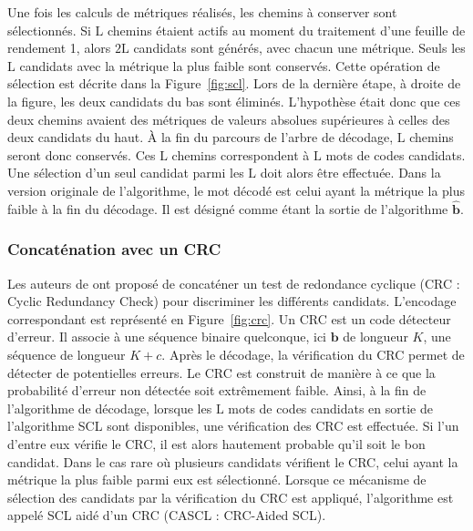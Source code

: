 Une fois les calculs de métriques réalisés, les chemins à conserver sont sélectionnés. Si $\mathrm{L}$ chemins étaient actifs au moment du traitement d'une feuille de rendement 1, alors $2\mathrm{L}$ candidats sont générés, avec chacun une métrique. Seuls les $\mathrm{L}$ candidats avec la métrique la plus faible sont conservés. Cette opération de sélection est décrite dans la Figure~\ref{fig:scl}. Lors de la dernière étape, à droite de la figure, les deux candidats du bas sont éliminés. L'hypothèse était donc que ces deux chemins avaient des métriques de valeurs absolues supérieures à celles des deux candidats du haut. \`A la fin du parcours de l'arbre de décodage, $\mathrm{L}$ chemins seront donc conservés. Ces $\mathrm{L}$ chemins correspondent à $\mathrm{L}$ mots de codes candidats. Une sélection d'un seul candidat parmi les $\mathrm{L}$ doit alors être effectuée. Dans la version originale de l'algorithme, le mot décodé est celui ayant la métrique la plus faible à la fin du décodage. Il est désigné comme étant la sortie de l'algorithme $\mathbold{\hat{b}}$.


\subsubsection{Concaténation avec un CRC}

Les auteurs de \cite{tal_how_2013} ont proposé de concaténer un test de redondance cyclique (CRC : Cyclic Redundancy Check) pour discriminer les différents candidats. L'encodage correspondant est représenté en Figure~\ref{fig:crc}. Un CRC est un code détecteur d'erreur. Il associe à une séquence binaire quelconque, ici $\mathbold{b}$ de longueur $K$, une séquence de longueur $K+c$. Après le décodage, la vérification du CRC permet de détecter de potentielles erreurs. Le CRC est construit de manière à ce que la probabilité d'erreur non détectée soit extrêmement faible.
Ainsi, à la fin de l'algorithme de décodage, lorsque les $\mathrm{L}$ mots de codes candidats en sortie de l'algorithme SCL sont disponibles, une vérification des CRC est effectuée. Si l'un d'entre eux vérifie le CRC, il est alors hautement probable qu'il soit le bon candidat. Dans le cas rare où plusieurs candidats vérifient le CRC, celui ayant la métrique la plus faible parmi eux est sélectionné. Lorsque ce mécanisme de sélection des candidats par la vérification du CRC est appliqué, l'algorithme est appelé \og SCL aidé d'un CRC \fg (CASCL : CRC-Aided SCL).

